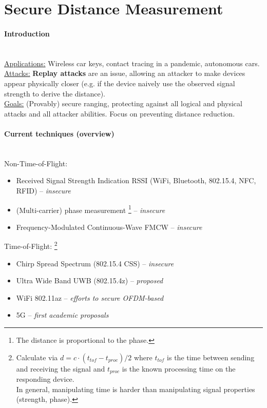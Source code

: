 \section{Secure Distance Measurement}

\paragraph{Introduction} \mbox{} \\
\underline{Applications:}
Wireless car keys, contact tracing in a pandemic, autonomous cars.
\\
\underline{Attacks:}
\textbf{Replay attacks} are an issue, allowing an attacker to make devices appear physically closer (e.g. if the device naively use the observed signal strength to derive the distance).
\\
\underline{Goals:}
(Provably) secure ranging, protecting against all logical and physical attacks and all attacker abilities.
Focus on preventing distance reduction.

\paragraph{Current techniques (overview)} \mbox{} \\
Non-Time-of-Flight:
\begin{itemize}
	\item Received Signal Strength Indication RSSI (WiFi, Bluetooth, 802.15.4, NFC, RFID) -- \textit{insecure}
	\item (Multi-carrier) phase measurement%
	\footnote{The distance is proportional to the phase.}	
	-- \textit{insecure}
	\item Frequency-Modulated Continuous-Wave FMCW -- \textit{insecure}
\end{itemize}

Time-of-Flight:%
\footnote{
Calculate via $d = c \cdot (t_{tof} - t_{proc}) / 2$
where $t_{tof}$ is the time between sending and receiving the signal and $t_{proc}$ is the known processing time on the responding device. \\
In general, manipulating time is harder than manipulating signal properties (strength, phase).}
\begin{itemize}
	\item Chirp Spread Spectrum (802.15.4 CSS) -- \textit{insecure}
	\item Ultra Wide Band UWB (802.15.4z) -- \textit{proposed}
	\item WiFi 802.11az -- \textit{efforts to secure OFDM-based}
	\item 5G -- \textit{first academic proposals}
\end{itemize}

